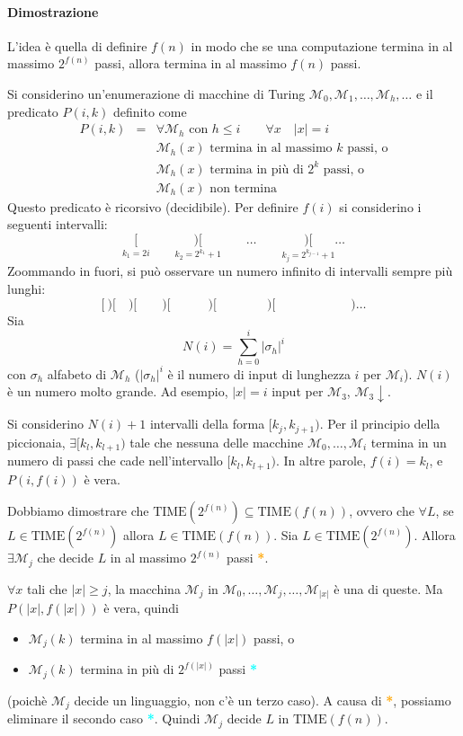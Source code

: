 \paragraph{Dimostrazione} L'idea è quella di definire $f(n)$ in modo che se una computazione termina in al massimo $2^{f(n)}$ passi, allora termina in al massimo $f(n)$ passi.

Si considerino un'enumerazione di macchine di Turing $\mathcal{M}_0,\mathcal{M}_1,\dots,\mathcal{M}_h,\dots$ e il predicato $P(i,k)$ definito come 
\begin{eqnarray*}
    P(i,k) &=& \forall\mathcal{M}_h \text{ con } h\leq i \qquad \forall x \quad |x|=i\\
    & & \mathcal{M}_h(x) \text{ termina in al massimo } k \text{ passi, o}\\
    & & \mathcal{M}_h(x) \text{ termina in più di } 2^k \text{ passi, o}\\
    & & \mathcal{M}_h(x) \text{ non termina}
\end{eqnarray*}
Questo predicato è ricorsivo (decidibile). Per definire $f(i)$ si considerino i seguenti intervalli:
$$
    \underset{k_1=2i}{[} \qquad \underset{k_2=2^{k_1}+1}{)[} \qquad\dots\qquad \underset{k_j=2^{k_{j-1}}+1}{)[} \dots
$$
Zoommando in fuori, si può osservare un numero infinito di intervalli sempre più lunghi:
$$
    [~)[\quad)[\qquad)[\quad\qquad)[\qquad\qquad)[\qquad\qquad\qquad)\dots
$$
Sia
$$
    N(i) = \sum_{h=0}^i |\sigma_h|^i
$$
con $\sigma_h$ alfabeto di $\mathcal{M}_h$ ($|\sigma_h|^i$ è il numero di input di lunghezza $i$ per $\mathcal{M}_i$). $N(i)$ è un numero molto grande. Ad esempio, $|x|=i$ input per $\mathcal{M}_3$, $\mathcal{M}_3\downarrow$.

Si considerino $N(i)+1$ intervalli della forma $[k_j,k_{j+1})$. Per il principio della piccionaia, $\exists [k_l,k_{l+1})$ tale che nessuna delle macchine $\mathcal{M}_0,\dots,\mathcal{M}_i$ termina in un numero di passi che cade nell'intervallo $[k_l,k_{l+1})$. In altre parole, $f(i)=k_l$, e $P(i,f(i))$ è vera.

Dobbiamo dimostrare che $\text{TIME}(2^{f(n)})\subseteq\text{TIME}(f(n))$, ovvero che $\forall L$, se $L\in\text{TIME}(2^{f(n)})$ allora $L\in\text{TIME}(f(n))$. Sia $L\in\text{TIME}(2^{f(n)})$. Allora $\exists\mathcal{M}_j$ che decide $L$ in al massimo $2^{f(n)}$ passi \textcolor{Orange}{\textbf{*}}.

$\forall x$ tali che $|x|\geq j$, la macchina $\mathcal{M}_j$ in $\mathcal{M}_0,\dots,\mathcal{M}_j,\dots,\mathcal{M}_{|x|}$ è una di queste. Ma $P(|x|,f(|x|))$ è vera, quindi 
\begin{itemize}
    \item $\mathcal{M}_j(k)$ termina in al massimo $f(|x|)$ passi, o 
    \item $\mathcal{M}_j(k)$ termina in più di $2^{f(|x|)}$ passi \textcolor{Cyan}{\textbf{*}}
\end{itemize}
(poichè $\mathcal{M}_j$ decide un linguaggio, non c'è un terzo caso). A causa di \textcolor{Orange}{\textbf{*}}, possiamo eliminare il secondo caso \textcolor{Cyan}{\textbf{*}}. Quindi $\mathcal{M}_j$ decide $L$ in $\text{TIME}(f(n))$.

